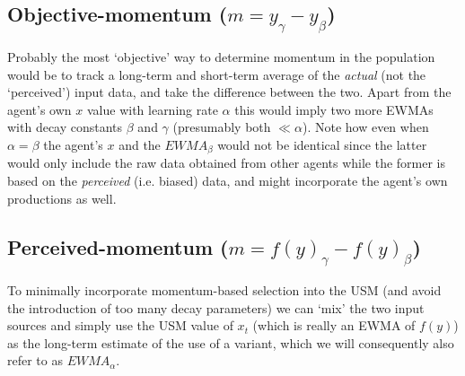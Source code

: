 

\subsection{Objective-momentum ($m=y_\gamma-y_\beta$)}

Probably the most `objective' way to determine momentum in the population would be to track a long-term and short-term average of the \emph{actual} (not the `perceived') input data, and take the difference between the two. Apart from the agent's own $x$ value with learning rate $\alpha$ this would imply two more EWMAs with decay constants $\beta$ and $\gamma$ (presumably both $\ll\alpha$). Note how even when $\alpha=\beta$ the agent's $x$ and the $EWMA_\beta$ would not be identical since the latter would only include the raw data obtained from other agents while the former is based on the \emph{perceived} (i.e. biased) data, and might incorporate the agent's own productions as well.

\subsection{Perceived-momentum ($m=f(y)_\gamma-f(y)_\beta$)}\label{momentum}

To minimally incorporate momentum-based selection into the USM (and avoid the introduction of too many decay parameters) we can `mix' the two input sources and simply use the USM value of $x_t$ (which is really an EWMA of $f(y)$) as the long-term estimate of the use of a variant, which we will consequently also refer to as $EWMA_\alpha$.



